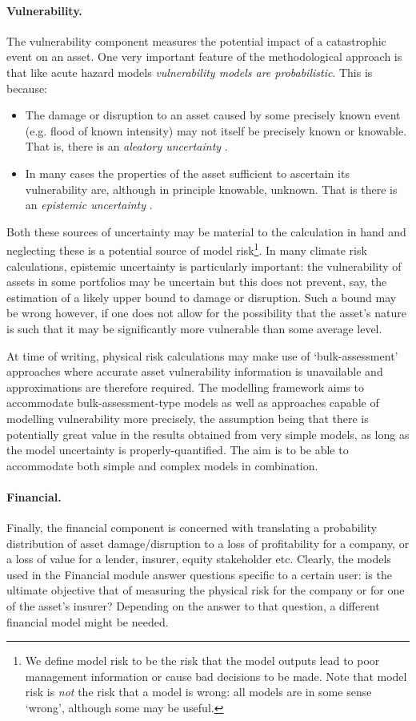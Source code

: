 \documentclass[a4paper,11pt]{extarticle} %
\theoremstyle{definition}
\begin{document}
\paragraph{Vulnerability.}
The vulnerability component measures the potential impact of a catastrophic event on an asset. One very important feature of the methodological approach is that like acute hazard models \emph{vulnerability models are probabilistic}. This is because:
\begin{itemize}
\item{The damage or disruption to an asset caused by some precisely known event (e.g. flood of known intensity) may not itself be precisely known or knowable. That is, there is an \emph{aleatory uncertainty} \cite{MitchellEtAl:2017}}.
\item{In many cases the properties of the asset sufficient to ascertain its vulnerability are, although in principle knowable, unknown. That is there is an \emph{epistemic uncertainty} \cite{MitchellEtAl:2017}}.
\end{itemize}
Both these sources of uncertainty may be material to the calculation in hand and neglecting these is a potential source of model risk\footnote{We define model risk to be the risk that the model outputs lead to poor management information or cause bad decisions to be made. Note that model risk is \emph{not} the risk that a model is wrong:  all models are in some sense `wrong', although some may be useful.}. In many climate risk calculations, epistemic uncertainty is particularly important: the vulnerability of assets in some portfolios may be uncertain but this does not prevent, say, the estimation of a likely upper bound to damage or disruption. Such a bound may be wrong however, if one does not allow for the possibility that the asset's nature is such that it may be significantly more vulnerable than some average level.

At time of writing, physical risk calculations may make use of `bulk-assessment' approaches where accurate asset vulnerability information is unavailable and approximations are therefore required. The modelling framework aims to accommodate bulk-assessment-type models as well as approaches capable of modelling vulnerability more precisely, the assumption being that there is potentially great value in the results obtained from very simple models, as long as the model uncertainty is properly-quantified. The aim is to be able to accommodate both simple and complex models in combination.

\paragraph{Financial.}
Finally, the financial component is concerned with translating a probability distribution of asset damage/disruption to a loss of profitability for a company, or a loss of value for a lender, insurer, equity stakeholder etc. Clearly, the models used in the Financial module answer questions specific to a certain user: is the ultimate objective that of measuring the physical risk for the company or for one of the asset's insurer? Depending on the answer to that question, a different financial model might be needed.
\end{document}
